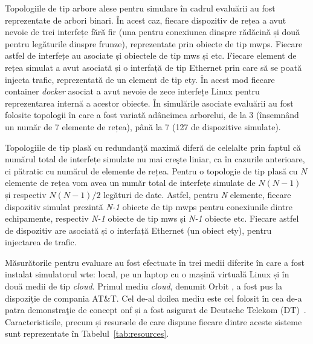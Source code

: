 Topologiile de tip arbore alese pentru simulare în cadrul evaluării au fost reprezentate de arbori binari. În acest caz, fiecare dispozitiv de rețea a avut nevoie de trei interfețe fără fir (una pentru conexiunea dinspre rădăcină și două pentru legăturile dinspre frunze), reprezentate prin obiecte de tip \gls{mwps}. Fiecare astfel de interfețe au asociate și obiectele de tip \gls{mws} și \gls{etc}. Fiecare element de rețea simulat a avut asociată și o interfață de tip Ethernet prin care să se poată injecta trafic, reprezentată de un element de tip \gls{ety}. În acest mod fiecare container \textit{docker} asociat a avut nevoie de zece interfețe Linux pentru reprezentarea internă a acestor obiecte. În simulările asociate evaluării au fost folosite topologii în care a fost variată adâncimea arborelui, de la 3 (însemnând un număr de 7 elemente de rețea), până la 7 (127 de dispozitive simulate).

Topologiile de tip plasă cu redundanţă maximă diferă de celelalte prin faptul că numărul total de interfețe simulate nu mai creşte liniar, ca în cazurile anterioare, ci pătratic cu numărul de elemente de rețea. Pentru o topologie de tip plasă cu $ N $ elemente de rețea vom avea un număr total de interfețe simulate de $ N(N-1) $ și respectiv $ N(N-1)/2 $ legături de date. Astfel, pentru \textit{N} elemente, fiecare dispozitiv simulat prezintă \textit{N-1} obiecte de tip \gls{mwps} pentru conexiunile dintre echipamente, respectiv \textit{N-1} obiecte de tip \gls{mws} și \textit{N-1} obiecte \gls{etc}. Fiecare astfel de dispozitiv are asociată și o interfață Ethernet (un obiect \gls{ety}), pentru injectarea de trafic.

Măsurătorile pentru evaluare au fost efectuate în trei medii diferite în care a fost instalat simulatorul \gls{wte}: local, pe un laptop cu o mașină virtuală Linux și în două medii de tip \textit{cloud}. Primul mediu \textit{cloud}, denumit Orbit \cite{orbitpage}, a fost pus la dispoziţie de compania AT\&T. Cel de-al doilea mediu este cel folosit în cea de-a patra demonstraţie de concept \gls{onf} și a fost asigurat de Deutsche Telekom (DT)~\cite{onf2017_poc4}. Caracteristicile, precum și resursele de care dispune fiecare dintre aceste sisteme sunt reprezentate în Tabelul~\ref{tab:resources}.

